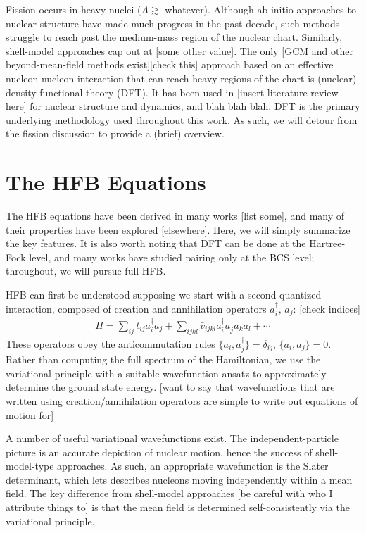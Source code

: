 \documentclass[../thesis.tex]{subfiles}
\begin{document}
\vspace{-1\baselineskip}

Fission occurs in heavy nuclei ($A\gtrsim$ whatever). Although ab-initio approaches to nuclear structure have made much progress in the past decade, such methods struggle to reach past the medium-mass region of the nuclear chart. Similarly, shell-model approaches cap out at [some other value]. The only [GCM and other beyond-mean-field methods exist][check this] approach based on an effective nucleon-nucleon interaction that can reach heavy regions of the chart is (nuclear) density functional theory (DFT). It has been used in [insert literature review here] for nuclear structure and dynamics, and blah blah blah. DFT is the primary underlying methodology used throughout this work. As such, we will detour from the fission discussion to provide a (brief) overview.

\section{The HFB Equations}
The HFB equations have been derived in many works [list some], and many of their properties have been explored [elsewhere]. Here, we will simply summarize the key features. It is also worth noting that DFT can be done at the Hartree-Fock level, and many works have studied pairing only at the BCS level; throughout, we will pursue full HFB.

HFB can first be understood supposing we start with a second-quantized interaction, composed of creation and annihilation operators $a_i^\dagger,\,a_j$: [check indices]
\begin{align}
	H=\sum_{ij}t_{ij}a_i^\dagger a_j+\sum_{ijkl}\bar{v}_{ijkl}a_i^\dagger a_j^\dagger a_ka_l+\cdots
\end{align}
These operators obey the anticommutation rules $\{a_i,a_j^\dagger\}=\delta_{ij}$, $\{a_i,a_j\}=0.$ Rather than computing the full spectrum of the Hamiltonian, we use the variational principle with a suitable wavefunction ansatz to approximately determine the ground state energy. [want to say that wavefunctions that are written using creation/annihilation operators are simple to write out equations of motion for]

A number of useful variational wavefunctions exist. The independent-particle picture is an accurate depiction of nuclear motion, hence the success of shell-model-type approaches. As such, an appropriate wavefunction is the Slater determinant, which lets describes nucleons moving independently within a mean field. The key difference from shell-model approaches [be careful with who I attribute things to] is that the mean field is determined self-consistently via the variational principle.
\end{document}

